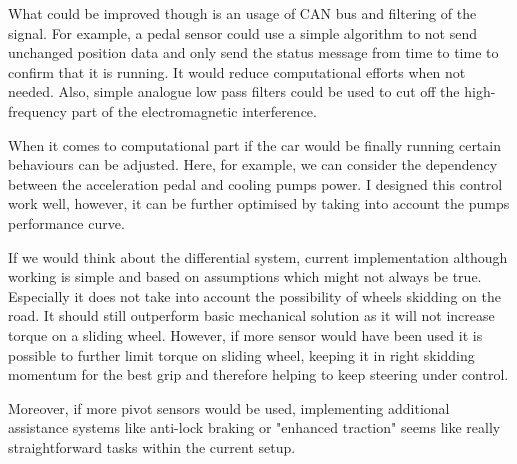 What could be improved though is an usage of CAN bus and filtering of the signal. For example, a pedal sensor could use a simple algorithm to not send unchanged position data and only send the status message from time to time to confirm that it is running. It would reduce computational efforts when not needed. 
Also, simple analogue low pass filters could be used to cut off the high-frequency part of the electromagnetic interference.



When it comes to computational part if the car would be finally running certain behaviours can be adjusted. Here, for example, we can consider the dependency between the acceleration pedal and cooling pumps power. I designed this control work well, however, it can be further optimised by taking into account the pumps performance curve.


If we would think about the differential system, current implementation although working is simple and based on assumptions which might not always be true. Especially it does not take into account the possibility of wheels skidding on the road. It should still outperform basic mechanical solution as it will not increase torque on a sliding wheel. However, if more sensor would have been used it is possible to further limit torque on sliding wheel, keeping it in right skidding momentum for the best grip and therefore helping to keep steering under control.

Moreover, if more pivot sensors would be used, implementing additional assistance systems like anti-lock braking or "enhanced traction" seems like really straightforward tasks within the current setup. 